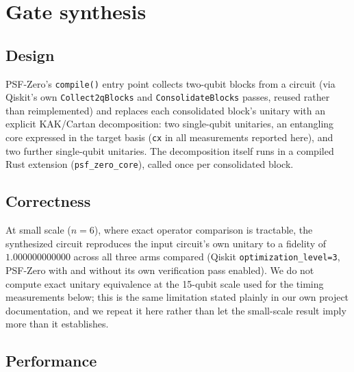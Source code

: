 \documentclass[11pt]{article}
\begin{document}
\section{Gate synthesis}
\label{sec:synth}

\subsection{Design}

PSF-Zero's \texttt{compile()} entry point collects two-qubit blocks from
a circuit (via Qiskit's own \texttt{Collect2qBlocks} and
\texttt{ConsolidateBlocks} passes, reused rather than reimplemented) and
replaces each consolidated block's unitary with an explicit KAK/Cartan
decomposition: two single-qubit unitaries, an entangling core expressed
in the target basis (\texttt{cx} in all measurements reported here), and
two further single-qubit unitaries. The decomposition itself runs in a
compiled Rust extension (\texttt{psf\_zero\_core}), called once per
consolidated block.

\subsection{Correctness}

At small scale ($n=6$), where exact operator comparison is tractable,
the synthesized circuit reproduces the input circuit's own unitary to a
fidelity of $1.000000000000$ across all three arms compared (Qiskit
\texttt{optimization\_level=3}, PSF-Zero with and without its own
verification pass enabled). We do not compute exact unitary equivalence
at the 15-qubit scale used for the timing measurements below; this is
the same limitation stated plainly in our own project documentation,
and we repeat it here rather than let the small-scale result imply
more than it establishes.

\subsection{Performance}
\end{document}
